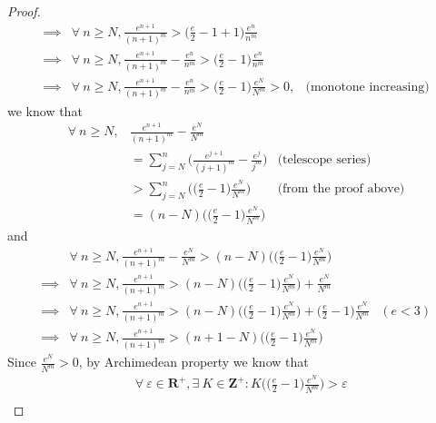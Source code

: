 \begin{proof}
\begin{align*}
        \implies & \forall\ n \geq N, \frac{e^{n + 1}}{(n + 1)^m} > \bigg(\frac{e}{2} - 1 + 1\bigg) \frac{e^n}{n^m}                                                   \\
        \implies & \forall\ n \geq N, \frac{e^{n + 1}}{(n + 1)^m} - \frac{e^n}{n^m} > \bigg(\frac{e}{2} - 1\bigg) \frac{e^n}{n^m}                                     \\
        \implies & \forall\ n \geq N, \frac{e^{n + 1}}{(n + 1)^m} - \frac{e^n}{n^m} > \bigg(\frac{e}{2} - 1\bigg) \frac{e^N}{N^m} > 0, & \text{(monotone increasing)}
    \end{align*}
    we know that
    \begin{align*}
        \forall\ n \geq N, & \frac{e^{n + 1}}{(n + 1)^m} - \frac{e^N}{N^m}                                                              \\
                           & = \sum_{j = N}^n \bigg(\frac{e^{j + 1}}{(j + 1)^m} - \frac{e^j}{j^m}\bigg) & \text{(telescope series)}     \\
                           & > \sum_{j = N}^n \Bigg(\bigg(\frac{e}{2} - 1\bigg) \frac{e^N}{N^m}\Bigg)   & \text{(from the proof above)} \\
                           & = (n - N) \Bigg(\bigg(\frac{e}{2} - 1\bigg) \frac{e^N}{N^m}\Bigg)
    \end{align*}
    and
    \begin{align*}
                 & \forall\ n \geq N, \frac{e^{n + 1}}{(n + 1)^m} - \frac{e^N}{N^m} > (n - N) \Bigg(\bigg(\frac{e}{2} - 1\bigg) \frac{e^N}{N^m}\Bigg)                                       \\
        \implies & \forall\ n \geq N, \frac{e^{n + 1}}{(n + 1)^m} > (n - N) \Bigg(\bigg(\frac{e}{2} - 1\bigg) \frac{e^N}{N^m}\Bigg) + \frac{e^N}{N^m}                                       \\
        \implies & \forall\ n \geq N, \frac{e^{n + 1}}{(n + 1)^m} > (n - N) \Bigg(\bigg(\frac{e}{2} - 1\bigg) \frac{e^N}{N^m}\Bigg) + \bigg(\frac{e}{2} - 1\bigg) \frac{e^N}{N^m} & (e < 3) \\
        \implies & \forall\ n \geq N, \frac{e^{n + 1}}{(n + 1)^m} > (n + 1 - N) \Bigg(\bigg(\frac{e}{2} - 1\bigg) \frac{e^N}{N^m}\Bigg)
    \end{align*}
    Since \(\frac{e^N}{N^m} > 0\), by Archimedean property we know that
    \begin{align*}
                 & \forall\ \varepsilon \in \mathbf{R}^+, \exists\ K \in \mathbf{Z}^+ : K \Bigg(\bigg(\frac{e}{2} - 1\bigg) \frac{e^N}{N^m}\Bigg) > \varepsilon                                \\

\end{align*}
\end{proof}
